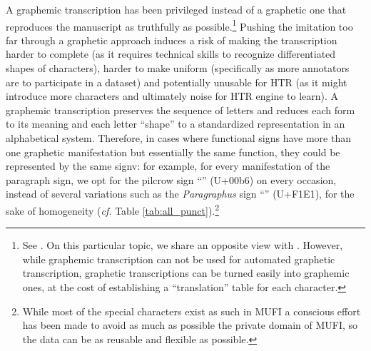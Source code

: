 \documentclass{article}
\newcommand{\juni}[1]{\textsf{\junicodeFont #1}}%
\begin{document}
A graphemic transcription has been privileged instead of a graphetic one that reproduces the manuscript as truthfully as possible.\footnote{See \cite{camps2021creation}. On this particular topic, we share an opposite view with \cite{gueville:halshs-03725166}. However, while graphemic transcription can not be used for automated graphetic transcription, graphetic transcriptions can be turned easily into graphemic ones, at the cost of establishing a \enquote{translation} table for each character.} Pushing the imitation too far through a graphetic approach induces a risk of making the transcription harder to complete (as it requires technical skills to recognize differentiated shapes of characters), harder to make uniform (specifically as more annotators are to participate in a dataset) and potentially unusable for HTR (as it might introduce more characters and ultimately noise for HTR engine to learn). A graphemic transcription preserves the sequence of letters and reduces each form to its meaning and each letter \enquote{shape} to a standardized representation in an alphabetical system. %
Therefore, in cases where functional signs have more than one graphetic manifestation but essentially the same function, they could be represented by the same signv: for example, for every manifestation of the paragraph sign, we opt for the pilcrow sign \enquote{\juni{}} (U+00b6) on every occasion, instead of several variations such as the \textit{Paragraphus} sign \enquote{\juni{}} (U+F1E1), for the sake of homogeneity (\textit{cf.} Table \ref{tab:all_punct}).\footnote{While most of the special characters exist as such in MUFI a conscious effort has been made to avoid as much as possible the private domain of MUFI, so the data can be as reusable and flexible as possible.}
\end{document}
